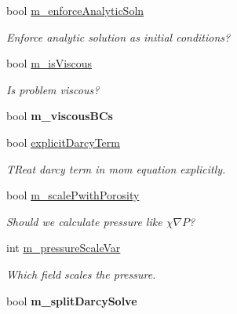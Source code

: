 \begin{DoxyCompactItemize}
\item 
\hypertarget{class_a_m_r_level_mushy_layer_a3e84e8df24a1e38639c20b087e57898f}{bool \hyperlink{class_a_m_r_level_mushy_layer_a3e84e8df24a1e38639c20b087e57898f}{m\-\_\-enforce\-Analytic\-Soln}}\label{class_a_m_r_level_mushy_layer_a3e84e8df24a1e38639c20b087e57898f}

\begin{DoxyCompactList}\small\item\em Enforce analytic solution as initial conditions? \end{DoxyCompactList}\item 
\hypertarget{class_a_m_r_level_mushy_layer_a81cc07f84fdb23699edb0cd0947f43e3}{bool \hyperlink{class_a_m_r_level_mushy_layer_a81cc07f84fdb23699edb0cd0947f43e3}{m\-\_\-is\-Viscous}}\label{class_a_m_r_level_mushy_layer_a81cc07f84fdb23699edb0cd0947f43e3}

\begin{DoxyCompactList}\small\item\em Is problem viscous? \end{DoxyCompactList}\item 
\hypertarget{class_a_m_r_level_mushy_layer_af3468fbc83ccd99b67ae99bfce938210}{bool {\bfseries m\-\_\-viscous\-B\-Cs}}\label{class_a_m_r_level_mushy_layer_af3468fbc83ccd99b67ae99bfce938210}

\item 
\hypertarget{class_a_m_r_level_mushy_layer_acda4a7343a5b352ba224e6da9273825b}{bool \hyperlink{class_a_m_r_level_mushy_layer_acda4a7343a5b352ba224e6da9273825b}{explicit\-Darcy\-Term}}\label{class_a_m_r_level_mushy_layer_acda4a7343a5b352ba224e6da9273825b}

\begin{DoxyCompactList}\small\item\em T\-Reat darcy term in mom equation explicitly. \end{DoxyCompactList}\item 
\hypertarget{class_a_m_r_level_mushy_layer_a33b45393c7bac5c1bfec26a3ddc1bedf}{bool \hyperlink{class_a_m_r_level_mushy_layer_a33b45393c7bac5c1bfec26a3ddc1bedf}{m\-\_\-scale\-Pwith\-Porosity}}\label{class_a_m_r_level_mushy_layer_a33b45393c7bac5c1bfec26a3ddc1bedf}

\begin{DoxyCompactList}\small\item\em Should we calculate pressure like $ \chi \nabla P $? \end{DoxyCompactList}\item 
int \hyperlink{class_a_m_r_level_mushy_layer_a53408b847afbe94238f1f19daf166f2f}{m\-\_\-pressure\-Scale\-Var}
\begin{DoxyCompactList}\small\item\em Which field scales the pressure. \end{DoxyCompactList}\item 
\hypertarget{class_a_m_r_level_mushy_layer_a5c4b489e6ec6338b9f245f9786d31e46}{bool {\bfseries m\-\_\-split\-Darcy\-Solve}}\label{class_a_m_r_level_mushy_layer_a5c4b489e6ec6338b9f245f9786d31e46}


\end{DoxyCompactItemize}
